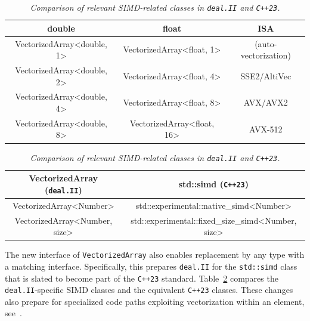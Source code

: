 \documentclass{ansarticle-preprint}
\newcommand{\specialword}[1]{\texttt{#1}}
\newcommand{\dealii}{{\specialword{deal.II}}\xspace}
\begin{document}
\begin{table}
  \caption{\it Supported vector lengths of the class \texttt{VectorizedArray} and
    the corresponding instruction-set-architecture extensions. }\label{tab:vectorizedarray}
  \centering
  \begin{tabular}{ccc}
    \toprule
    \textbf{double}            & \textbf{float}             & \textbf{ISA}         \\
    \midrule
    VectorizedArray<double, 1> & VectorizedArray<float, 1>  & (auto-vectorization) \\
    VectorizedArray<double, 2> & VectorizedArray<float, 4>  & SSE2/AltiVec         \\
    VectorizedArray<double, 4> & VectorizedArray<float, 8>  & AVX/AVX2             \\
    VectorizedArray<double, 8> & VectorizedArray<float, 16> & AVX-512              \\
    \bottomrule
  \end{tabular}

  \caption{\it Comparison of relevant SIMD-related classes in \dealii{} and \texttt{C++23}.}\label{tab:simd}
  \centering
  \begin{tabular}{cc}
    \toprule
    \textbf{VectorizedArray (\dealii{})} & \textbf{std::simd (\texttt{C++23})}                \\
    \midrule
    VectorizedArray<Number>              & std::experimental::native\_simd<Number>            \\
    VectorizedArray<Number, size>        & std::experimental::fixed\_size\_simd<Number, size> \\ \bottomrule
  \end{tabular}
\end{table}

The new interface of \texttt{VectorizedArray} also enables replacement
by any type with a matching interface. Specifically, this prepares
\dealii{} for the \texttt{std::simd} class that is slated to become
part of the \texttt{C++23} standard.
Table~\ref{tab:simd} compares the \dealii{}-specific SIMD classes and
the equivalent \texttt{C++23} classes. These changes also prepare for specialized
code paths exploiting
vectorization within an element, see~\cite{KronbichlerKormann2019}.

\end{document}
